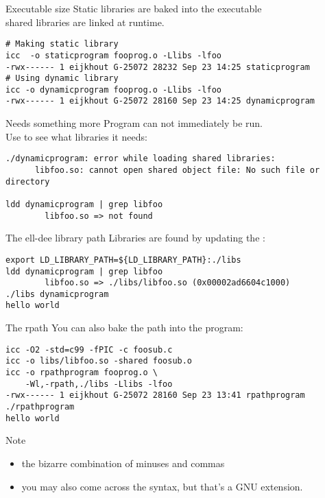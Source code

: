 \documentclass[11pt,headernav]{beamer}
\begin{document}
\begin{numberedframe}{Executable size}
  \label{sl-tut:exsize}
  Static libraries are baked into the executable\\
  shared libraries are linked at runtime.

  \footnotesize
\begin{verbatim}
# Making static library
icc  -o staticprogram fooprog.o -Llibs -lfoo
-rwx------ 1 eijkhout G-25072 28232 Sep 23 14:25 staticprogram
# Using dynamic library
icc -o dynamicprogram fooprog.o -Llibs -lfoo
-rwx------ 1 eijkhout G-25072 28160 Sep 23 14:25 dynamicprogram
\end{verbatim}
\begin{comment}
# Using shared library
icc -o rpathprogram fooprog.o -Wl,,rpath=./libs -Llibs -lfoo
-rwx------ 1 eijkhout G-25072 28160 Sep 23 14:25 rpathprogram
\end{comment}
\end{numberedframe}

\begin{numberedframe}{Needs something more}
  \label{sl-tut:libso.3}
  Program can not immediately be run.\\
  Use  to see what libraries it needs:

  \footnotesize
\begin{verbatim}
./dynamicprogram: error while loading shared libraries:
      libfoo.so: cannot open shared object file: No such file or directory

ldd dynamicprogram | grep libfoo
        libfoo.so => not found
\end{verbatim}
\end{numberedframe}

\begin{numberedframe}{The ell-dee library path}
  \label{sl-tut:libso.4}
Libraries are found by updating the :

  \footnotesize
\begin{verbatim}
export LD_LIBRARY_PATH=${LD_LIBRARY_PATH}:./libs
ldd dynamicprogram | grep libfoo
        libfoo.so => ./libs/libfoo.so (0x00002ad6604c1000)
./libs dynamicprogram
hello world
\end{verbatim}
\end{numberedframe}

\begin{numberedframe}{The rpath}
  \label{sl-tut:libso.5}
  You can also bake the path into the program:

  \footnotesize
\begin{verbatim}
icc -O2 -std=c99 -fPIC -c foosub.c
icc -o libs/libfoo.so -shared foosub.o
icc -o rpathprogram fooprog.o \
    -Wl,-rpath,./libs -Llibs -lfoo
-rwx------ 1 eijkhout G-25072 28160 Sep 23 13:41 rpathprogram
./rpathprogram
hello world
\end{verbatim}
Note
\begin{itemize}
\item
  the bizarre combination of minuses and commas
\item you may also come across the  syntax,
  but that's a GNU extension.
\end{itemize}
\end{numberedframe}
\end{document}
